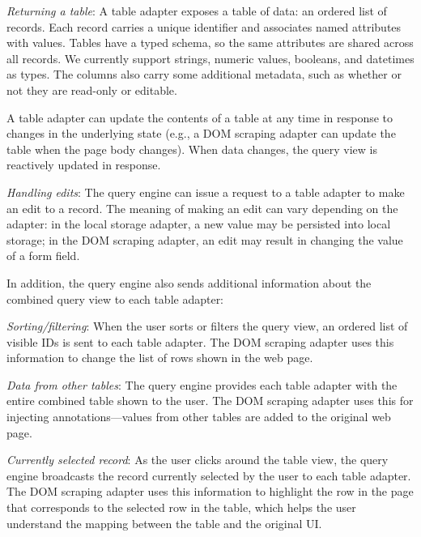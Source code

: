 \documentclass[sigplan,screen,10pt,anonymous,review]{acmart}
\providecommand{\DIFdelbegin}{} %
\providecommand{\DIFdelend}{} %
\begin{document}
\DIFdelbegin %

\DIFdelend \emph{Returning a table}: A table adapter exposes a table of data: an
ordered list of records. Each record carries a unique identifier and
associates named attributes with values. Tables have a typed schema, so
the same attributes are shared across all records. We currently support
strings, numeric values, booleans, and datetimes as types. The columns
also carry some additional metadata, such as whether or not they are
read-only or editable.

A table adapter can update the contents of a table at any time in
response to changes in the underlying state (e.g., a DOM scraping
adapter can update the table when the page body changes). When data
changes, the query view is reactively updated in response.

\emph{Handling edits}: The query engine can issue a request to a table
adapter to make an edit to a record. The meaning of making an edit can
vary depending on the adapter: in the local storage adapter, a new value
may be persisted into local storage; in the DOM scraping adapter, an
edit may result in changing the value of a form field.

In addition, the query engine also sends additional information about
the combined query view to each table adapter:

\emph{Sorting/filtering}: When the user sorts or filters the query view,
an ordered list of visible IDs is sent to each table adapter. The DOM
scraping adapter uses this information to change the list of rows shown
in the web page.

\emph{Data from other tables}: The query engine provides each table
adapter with the entire combined table shown to the user. The DOM
scraping adapter uses this for injecting annotations---values from other
tables are added to the original web page.

\emph{Currently selected record}: As the user clicks around the table
view, the query engine broadcasts the record currently selected by the
user to each table adapter. The DOM scraping adapter uses this
information to highlight the row in the page that corresponds to the
selected row in the table, which helps the user understand the mapping
between the table and the original UI.
\end{document}
